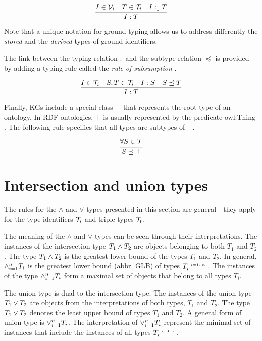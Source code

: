 \documentclass[runningheads]{llncs}
\newcommand{\s}{\scriptscriptstyle\ \,}
\newcommand{\darr}{\downarrow}
\newcommand{\V}{{\cal V}}
\newcommand{\T}{{\cal T}}
\begin{document}
\begin{equation}
\dfrac{I\in\V_i\quad\/T\in\T_i\quad\/I:_\darr\/T}
      {I:T}
\end{equation}

Note that a unique notation for ground typing allows us to address
differently the \emph{stored} and the \emph{derived} types of ground
identifiers.

The link between the typing relation $:$ and the subtype relation
$\preceq$ is provided by adding a typing rule called the \emph{rule of
  subsumption} \cite{Pierce2002}.

\begin{equation}
\label{rul:typing-subsumption}
\dfrac{I\in\T_i\quad\/S,T\in\T_i\quad\/I:S\quad\/S\preceq\/T}
      {I:T}    
\end{equation}

Finally, KGs include a special class $\top$ that represents the root
type of an ontology. In RDF ontologies, $\top$ is usually represented
by the predicate owl:Thing \cite{Hoffart2013}. The following rule
specifies that all types are subtypes of $\top$.

\begin{equation}
\dfrac{\forall\/S\in\T}
      {S\preceq\top}
\end{equation}






\section{Intersection and union types\label{sec:intsc-union}}

The rules for the $\land$ and $\lor$-types presented in this section
are general---they apply for the type identifiers $\T_i$ and triple
types $\T_t$.

The meaning of the $\land$ and $\lor$-types can be seen through
their interpretations. The instances of the intersection type
$T_1\land\/T_2$ are objects belonging to both $T_1$ and $T_2$. The
type $T_1\land\/T_2$ is the greatest lower bound of the types $T_1$
and $T_2$. In general, $\land_{i=1}^n\/T_i$ is the greatest lower
bound (abbr. GLB) of types $T_i^{\s\/i=1..n}$
\cite{Pierce1991,Pierce1996}. The instances of the type
$\land_{i=1}^n\/T_i$ form a maximal set of objects that belong to
all types $T_i$.

The union type is dual to the intersection type. The instances of
the union type $T_1\lor\/T_2$ are objects from the interpretations of
both types, $T_1$ and $T_2$. The type $T_1\lor\/T_2$ denotes the least
upper bound of types $T_1$ and $T_2$. A general form of union type is
$\lor_{i=1}^n\/T_i$. The interpretation of $\lor_{i=1}^n\/T_i$
represent the minimal set of instances that include the instances of
all types $T_i^{\s\/i=1..n}$.
\end{document}
